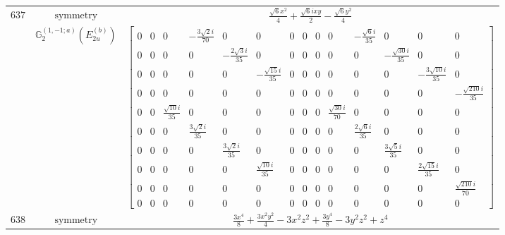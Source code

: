 \documentclass[fleqn,8pt,landscape]{jsarticle}
\begin{document}
\begin{longtable}{ccc}
$ 637 $ & $ \text{symmetry} $ & $ \frac{\sqrt{6} x^{2}}{4} + \frac{\sqrt{6} i x y}{2} - \frac{\sqrt{6} y^{2}}{4} $ \\
$  $ & $ \mathbb{G}_{2}^{(1,-1;a)}(E_{2u}^{(b)}) $ & $ \begin{bmatrix} 0 & 0 & 0 & - \frac{3 \sqrt{2} i}{70} & 0 & 0 & 0 & 0 & 0 & 0 & - \frac{\sqrt{6} i}{35} & 0 & 0 & 0 \\ 0 & 0 & 0 & 0 & - \frac{2 \sqrt{3} i}{35} & 0 & 0 & 0 & 0 & 0 & 0 & - \frac{\sqrt{30} i}{35} & 0 & 0 \\ 0 & 0 & 0 & 0 & 0 & - \frac{\sqrt{15} i}{35} & 0 & 0 & 0 & 0 & 0 & 0 & - \frac{3 \sqrt{10} i}{35} & 0 \\ 0 & 0 & 0 & 0 & 0 & 0 & 0 & 0 & 0 & 0 & 0 & 0 & 0 & - \frac{\sqrt{210} i}{35} \\ 0 & 0 & \frac{\sqrt{10} i}{35} & 0 & 0 & 0 & 0 & 0 & 0 & \frac{\sqrt{30} i}{70} & 0 & 0 & 0 & 0 \\ 0 & 0 & 0 & \frac{3 \sqrt{2} i}{35} & 0 & 0 & 0 & 0 & 0 & 0 & \frac{2 \sqrt{6} i}{35} & 0 & 0 & 0 \\ 0 & 0 & 0 & 0 & \frac{3 \sqrt{2} i}{35} & 0 & 0 & 0 & 0 & 0 & 0 & \frac{3 \sqrt{5} i}{35} & 0 & 0 \\ 0 & 0 & 0 & 0 & 0 & \frac{\sqrt{10} i}{35} & 0 & 0 & 0 & 0 & 0 & 0 & \frac{2 \sqrt{15} i}{35} & 0 \\ 0 & 0 & 0 & 0 & 0 & 0 & 0 & 0 & 0 & 0 & 0 & 0 & 0 & \frac{\sqrt{210} i}{70} \\ 0 & 0 & 0 & 0 & 0 & 0 & 0 & 0 & 0 & 0 & 0 & 0 & 0 & 0 \end{bmatrix} $ \\ \hline
$ 638 $ & $ \text{symmetry} $ & $ \frac{3 x^{4}}{8} + \frac{3 x^{2} y^{2}}{4} - 3 x^{2} z^{2} + \frac{3 y^{4}}{8} - 3 y^{2} z^{2} + z^{4} $ \\

\end{longtable}
\end{document}
